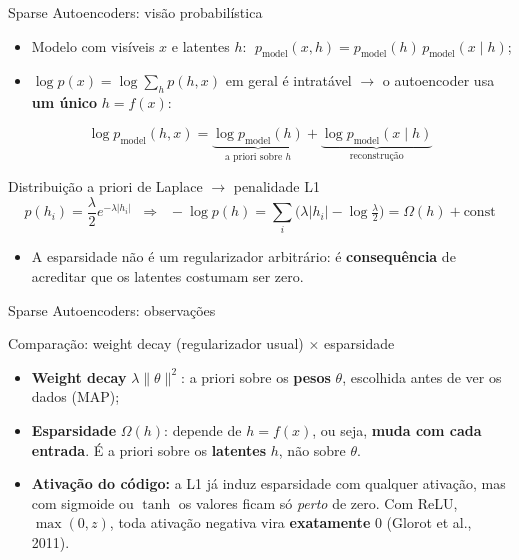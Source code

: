 \documentclass[aspectratio=169,xcolor=dvipsnames]{beamer}
\begin{document}
\begin{frame}{Sparse Autoencoders: visão probabilística}
    \begin{itemize}
        \item Modelo com visíveis $x$ e latentes $h$: $\;p_{\text{model}}(x, h) = p_{\text{model}}(h)\, p_{\text{model}}(x \mid h)$;
        \item $\log p(x) = \log \sum_h p(h, x)$ em geral é intratável $\rightarrow$ o autoencoder usa \textbf{um único} $h = f(x)$:
    \end{itemize}
    \[
        \log p_{\text{model}}(h, x) = \underbrace{\log p_{\text{model}}(h)}_{\text{a priori sobre } h} + \underbrace{\log p_{\text{model}}(x \mid h)}_{\text{reconstrução}}
    \]
    \begin{block}{Distribuição a priori de Laplace $\rightarrow$ penalidade L1}
        \[
            p(h_i) = \frac{\lambda}{2} e^{-\lambda |h_i|}
            \;\;\Rightarrow\;\;
            -\log p(h) = \sum_i \Big(\lambda |h_i| - \log \tfrac{\lambda}{2}\Big) = \Omega(h) + \text{const}
        \]
    \end{block}
    \begin{itemize}
        \item A esparsidade não é um regularizador arbitrário: é \textbf{consequência} de acreditar que os latentes costumam ser zero.
    \end{itemize}
\end{frame}
 
\begin{frame}{Sparse Autoencoders: observações}
    \begin{block}{Comparação: weight decay (regularizador usual) $\times$ esparsidade}
        \begin{itemize}
            \item \textbf{Weight decay} $\lambda \lVert \theta \rVert^2$: a priori sobre os \textbf{pesos} $\theta$, escolhida antes de ver os dados (MAP);
            \item \textbf{Esparsidade} $\Omega(h)$: depende de $h = f(x)$, ou seja, \textbf{muda com cada entrada}. É a priori sobre os \textbf{latentes} $h$, não sobre $\theta$.
        \end{itemize}
    \end{block}
    \begin{itemize}
        \item \textbf{Ativação do código:} a L1 já induz esparsidade com qualquer ativação, mas com sigmoide ou $\tanh$ os valores ficam só \textit{perto} de zero. Com ReLU, $\max(0, z)$, toda ativação negativa vira \textbf{exatamente} 0 (Glorot et al., 2011).
    \end{itemize}
\end{frame}
\end{document}
